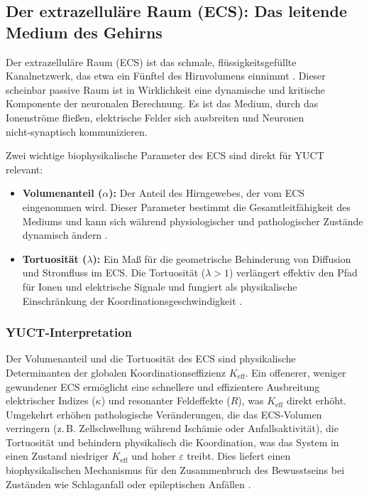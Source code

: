 \documentclass[12pt,a4paper]{article}
\begin{document}
	\subsection{Der extrazelluläre Raum (ECS): Das leitende Medium des Gehirns}
	
	Der extrazelluläre Raum (ECS) ist das schmale, flüssigkeitsgefüllte Kanalnetzwerk, das etwa ein Fünftel des Hirnvolumens einnimmt \cite{Nicholson2006}. Dieser scheinbar passive Raum ist in Wirklichkeit eine dynamische und kritische Komponente der neuronalen Berechnung. Es ist das Medium, durch das Ionenströme fließen, elektrische Felder sich ausbreiten und Neuronen nicht‑synaptisch kommunizieren.
	
	Zwei wichtige biophysikalische Parameter des ECS sind direkt für YUCT relevant:
	
	\begin{itemize}
		\item \textbf{Volumenanteil (\(\alpha\)):} Der Anteil des Hirngewebes, der vom ECS eingenommen wird. Dieser Parameter bestimmt die Gesamtleitfähigkeit des Mediums und kann sich während physiologischer und pathologischer Zustände dynamisch ändern \cite{Sykova2008}.
		\item \textbf{Tortuosität (\(\lambda\)):} Ein Maß für die geometrische Behinderung von Diffusion und Stromfluss im ECS. Die Tortuosität (\(\lambda > 1\)) verlängert effektiv den Pfad für Ionen und elektrische Signale und fungiert als physikalische Einschränkung der Koordinationsgeschwindigkeit \cite{Nicholson2006}.
	\end{itemize}
	
	\subsubsection*{YUCT‑Interpretation}
	Der Volumenanteil und die Tortuosität des ECS sind physikalische Determinanten der globalen Koordinationseffizienz \(K_{\mathrm{eff}}\). Ein offenerer, weniger gewundener ECS ermöglicht eine schnellere und effizientere Ausbreitung elektrischer Indizes (\(\kappa\)) und resonanter Feldeffekte (\(R\)), was \(K_{\mathrm{eff}}\) direkt erhöht. Umgekehrt erhöhen pathologische Veränderungen, die das ECS‑Volumen verringern (z. B. Zellschwellung während Ischämie oder Anfallsaktivität), die Tortuosität und behindern physikalisch die Koordination, was das System in einen Zustand niedriger \(K_{\mathrm{eff}}\) und hoher \(\varepsilon\) treibt. Dies liefert einen biophysikalischen Mechanismus für den Zusammenbruch des Bewusstseins bei Zuständen wie Schlaganfall oder epileptischen Anfällen \cite{Arranz2023}.
	
\end{document}
